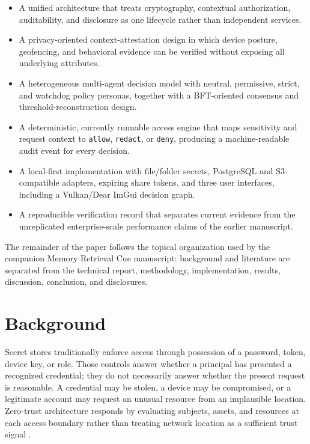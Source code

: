 \documentclass[10pt]{article}
\let\cite\citep
\begin{document}
\begin{itemize}
\item A unified architecture that treats cryptography, contextual authorization, auditability, and disclosure as one lifecycle rather than independent services.
\item A privacy-oriented context-attestation design in which device posture, geofencing, and behavioral evidence can be verified without exposing all underlying attributes.
\item A heterogeneous multi-agent decision model with neutral, permissive, strict, and watchdog policy personas, together with a BFT-oriented consensus and threshold-reconstruction design.
\item A deterministic, currently runnable access engine that maps sensitivity and request context to \texttt{allow}, \texttt{redact}, or \texttt{deny}, producing a machine-readable audit event for every decision.
\item A local-first implementation with file/folder secrets, PostgreSQL and S3-compatible adapters, expiring share tokens, and three user interfaces, including a Vulkan/Dear ImGui decision graph.
\item A reproducible verification record that separates current evidence from the unreplicated enterprise-scale performance claims of the earlier manuscript.
\end{itemize}

The remainder of the paper follows the topical organization used by the companion Memory Retrieval Cue manuscript: background and literature are separated from the technical report, methodology, implementation, results, discussion, conclusion, and disclosures.

\section*{Background}

Secret stores traditionally enforce access through possession of a password, token, device key, or role. Those controls answer whether a principal has presented a recognized credential; they do not necessarily answer whether the present request is reasonable. A credential may be stolen, a device may be compromised, or a legitimate account may request an unusual resource from an implausible location. Zero-trust architecture responds by evaluating subjects, assets, and resources at each access boundary rather than treating network location as a sufficient trust signal \cite{nistzt,nistztimpl}.
\end{document}
